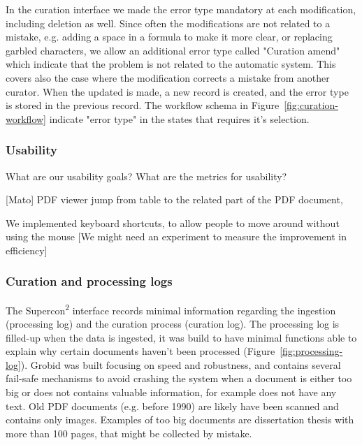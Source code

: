 \documentclass{article}
\begin{document}
In the curation interface we made the error type mandatory at each modification, including deletion as well. Since often the modifications are not related to a mistake, e.g. adding a space in a formula to make it more clear, or replacing garbled characters, we allow an additional error type called "Curation amend" which indicate that the problem is not related to the automatic system. This covers also the case where the modification corrects a mistake from another curator. 
When the updated is made, a new record is created, and the error type is stored in the previous record. The workflow schema in Figure~\ref{fig:curation-workflow} indicate "error type" in the states that requires it's selection. 

\subsubsection{Usability}
What are our usability goals? 
What are the metrics for usability? 

[Mato]
PDF viewer jump from table to the related part of the PDF document, 

We implemented keyboard shortcuts, to allow people to move around without using the mouse 
[We might need an experiment to measure the improvement in efficiency]




\subsubsection{Curation and processing logs}

The Supercon\textsuperscript{2} interface records minimal information regarding the ingestion (processing log) and the curation process (curation log). 
The processing log is filled-up when the data is ingested, it was build to have minimal functions able to explain why certain documents haven't been processed (Figure~\ref{fig:processing-log}). 
Grobid was built focusing on speed and robustness, and contains several fail-safe mechanisms to avoid crashing the system when a document is either too big or does not contains valuable information, for example does not have any text. Old PDF documents (e.g. before 1990) are likely have been scanned and contains only images. 
Examples of too big documents are dissertation thesis with more than 100 pages, that might be collected by mistake. 
\end{document}
